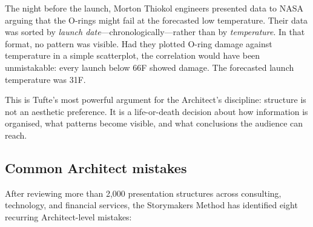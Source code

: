 The night before the launch, Morton Thiokol engineers presented data to NASA arguing that the O-rings might fail at the forecasted low temperature. Their data was sorted by \emph{launch date}---chronologically---rather than by \emph{temperature}. In that format, no pattern was visible. Had they plotted O-ring damage against temperature in a simple scatterplot, the correlation would have been unmistakable: every launch below 66\textdegree F showed damage. The forecasted launch temperature was 31\textdegree F.

This is Tufte's most powerful argument for the Architect's discipline: structure is not an aesthetic preference. It is a life-or-death decision about how information is organised, what patterns become visible, and what conclusions the audience can reach.

\subsection{Common Architect mistakes}

After reviewing more than 2,000 presentation structures across consulting, technology, and financial services, the Storymakers Method has identified eight recurring Architect-level mistakes:

